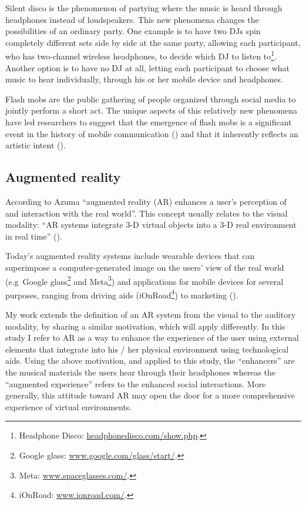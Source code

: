 \documentclass[a4paper,11pt]{article}
\begin{document}
Silent disco is the phenomenon of partying where the music is heard through headphones instead of loudspeakers.
This new phenomena changes the possibilities of an ordinary party.
One example is to have two DJs spin completely different sets side by side at the same party, allowing each participant, who has two-channel wireless headphones, to decide which DJ to listen to\footnote{Headphone Disco: \href{http://headphonedisco.com/show.php}{headphonedisco.com/show.php}.}.
Another option is to have no DJ at all, letting each participant to choose what music to hear individually, through his or her mobile device and headphones.

Flash mobs are the public gathering of people organized through social media to jointly perform a short act.
The unique aspects of this relatively new phenomena have led researchers to suggest that the emergence of flash mobs is a significant event in the history of mobile communication (\cite{nicholson05}) and that it inherently reflects an artistic intent (\cite{brejzek10}).

\subsection{Augmented reality} \label{literature:ar}

According to Azuma ``augmented reality (AR) enhances a user's perception of and interaction with the real world''.
This concept usually relates to the visual modality: ``AR systems integrate 3-D virtual objects into a 3-D real environment in real time'' (\cite{azuma97}).

Today's augmented reality systems include wearable devices that can superimpose a computer-generated image on the users' view of the real world (e.g\ Google glass\footnote{Google glass: \href{http://www.google.com/glass/start/}{www.google.com/glass/start/}.} and Meta\footnote{Meta: \href{https://www.spaceglasses.com/}{www.spaceglasses.com/}.}) and applications for mobile devices for several purposes, ranging from driving aids (iOnRoad\footnote{iOnRoad: \href{http://www.ionroad.com/}{www.ionroad.com/}.}) to marketing (\cite{ikea}).

My work extends the definition of an AR system from the visual to the auditory modality, by sharing a similar motivation, which will apply differently.
In this study I refer to AR as a way to enhance the experience of the user using external elements that integrate into his / her physical environment using technological aids.
Using the above motivation, and applied to this study, the ``enhancers'' are the musical materials the users hear through their headphones whereas the ``augmented experience'' refers to the enhanced social interactions.
More generally, this attitude toward AR may open the door for a more comprehensive experience of virtual environments.
\end{document}
